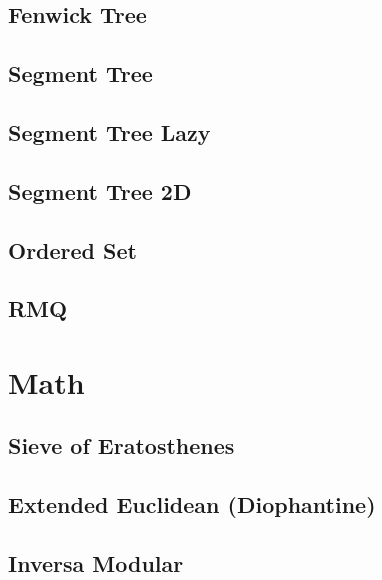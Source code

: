 \subsection{Fenwick Tree}
\raggedbottom
\hrulefill
\subsection{Segment Tree}
\raggedbottom
\hrulefill
\subsection{Segment Tree Lazy}
\raggedbottom
\hrulefill
\subsection{Segment Tree 2D}
\raggedbottom
\hrulefill
\subsection{Ordered Set}
\raggedbottom
\hrulefill
\subsection{RMQ}
\raggedbottom
\hrulefill

\section{Math}
\subsection{Sieve of Eratosthenes}
\raggedbottom
\hrulefill
\subsection{Extended Euclidean (Diophantine)}
\raggedbottom
\hrulefill
\subsection{Inversa Modular}
\raggedbottom
\hrulefill
